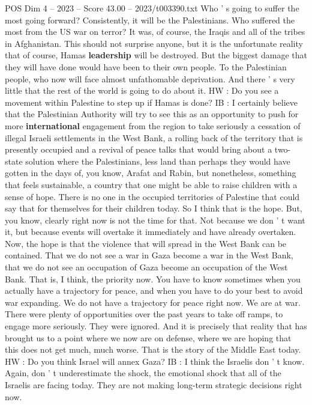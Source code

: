 \begin{textsample}{POS Dim 4 – 2023 – Score 43.00 – 2023/t003390.txt}
Who ' s going to suffer the most going forward?
Consistently, it will be the Palestinians.
Who suffered the most from the US war on terror?
It was, of course, the Iraqis and all of the tribes in Afghanistan.
This should not surprise anyone, but it is the unfortunate reality that of course, Hamas \textbf{leadership} will be destroyed.
But the biggest damage that they will have done would have been to their own people.
To the Palestinian people, who now will face almost unfathomable deprivation.
And there ' s very little that the rest of the world is going to do about it.
HW : Do you see a movement within Palestine to step up if Hamas is done?
IB : I certainly believe that the Palestinian Authority will try to see this as an opportunity to push for more \textbf{international} engagement from the region to take seriously a cessation of illegal Israeli settlements in the West Bank, a rolling back of the territory that is presently occupied and a revival of peace talks that would bring about a two-state solution where the Palestinians, less land than perhaps they would have gotten in the days of, you know, Arafat and Rabin, but nonetheless, something that feels sustainable, a country that one might be able to raise children with a sense of hope.
There is no one in the occupied territories of Palestine that could say that for themselves for their children today.
So I think that is the hope.
But, you know, clearly right now is not the time for that.
Not because we don ' t want it, but because events will overtake it immediately and have already overtaken.
Now, the hope is that the violence that will spread in the West Bank can be contained.
That we do not see a war in Gaza become a war in the West Bank, that we do not see an occupation of Gaza become an occupation of the West Bank.
That is, I think, the priority now.
You have to know sometimes when you actually have a trajectory for peace, and when you have to do your best to avoid war expanding.
We do not have a trajectory for peace right now.
We are at war.
There were plenty of opportunities over the past years to take off ramps, to engage more seriously.
They were ignored.
And it is precisely that reality that has brought us to a point where we now are on defense, where we are hoping that this does not get much, much worse.
That is the story of the Middle East today.
HW : Do you think Israel will annex Gaza?
IB : I think the Israelis don ' t know.
Again, don ' t underestimate the shock, the emotional shock that all of the Israelis are facing today.
They are not making long-term strategic decisions right now.

\end{textsample}
